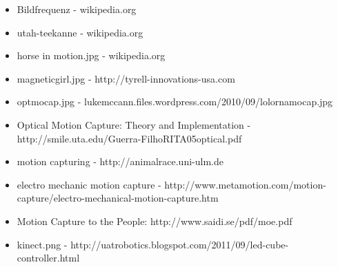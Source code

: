 \begin{itemize}
\item Bildfrequenz - wikipedia.org
\item utah-teekanne - wikipedia.org
\item horse in motion.jpg - wikipedia.org
\item magneticgirl.jpg - http://tyrell-innovations-usa.com
\item optmocap.jpg - lukemccann.files.wordpress.com/2010/09/lolornamocap.jpg
\item Optical Motion Capture: Theory and Implementation - http://smile.uta.edu/Guerra-FilhoRITA05optical.pdf
\item motion capturing - http://animalrace.uni-ulm.de
\item electro mechanic motion capture - http://www.metamotion.com/motion-capture/electro-mechanical-motion-capture.htm
\item Motion Capture to the People: http://www.saidi.se/pdf/moe.pdf
\item kinect.png - http://uatrobotics.blogspot.com/2011/09/led-cube-controller.html
\end{itemize}






